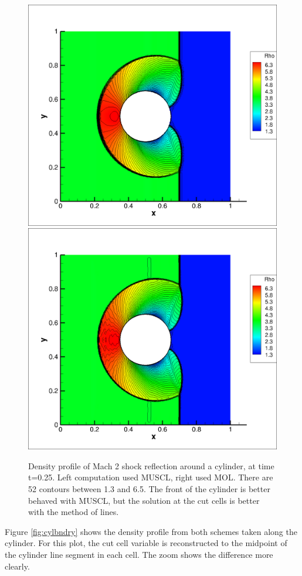 \begin{figure}[h]
\begin{center}
\vspace*{-.1in}
\hspace*{-.4in}
\includegraphics[width=0.48\linewidth,trim=10 10 200 10,clip]{figs/muscl_302cells.png}
\includegraphics[width=0.48\linewidth,trim=10 10 200 10,clip]{figs/MOL_302cells.png}
\caption{\sf Density profile of Mach 2 shock reflection around a cylinder,
at time t=0.25.  Left computation used MUSCL, right used MOL. 
There are 52 contours between 1.3 and 6.5.
The front of the cylinder is better behaved with MUSCL, but the solution
at the cut cells is better  with the method of lines.
\label{fig:cyl1}}
\end{center}
\vspace*{-.1in}
\end{figure}

Figure \ref{fig:cylbndry}
shows the density profile from both schemes
taken along the cylinder.
For this plot, the cut cell variable is
reconstructed to the midpoint of the cylinder line segment in each  cell.  
The zoom shows the difference more
clearly.

